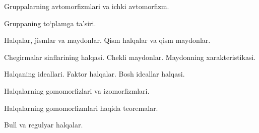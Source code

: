 Gruppalarning avtomorfizmlari va ichki avtomorfizm.

Gruppaning to`plamga ta'siri.

Halqalar, jismlar va maydonlar. Qism halqalar va qism maydonlar.

Chegirmalar sinflarining halqasi. Chekli maydonlar. Maydonning xarakteristikasi.

Halqaning ideallari. Faktor halqalar. Bosh ideallar halqasi.

Halqalarning gomomorfizlari va izomorfizmlari.

Halqalarning gomomorfizmlari haqida teoremalar.

Bull va regulyar halqalar.